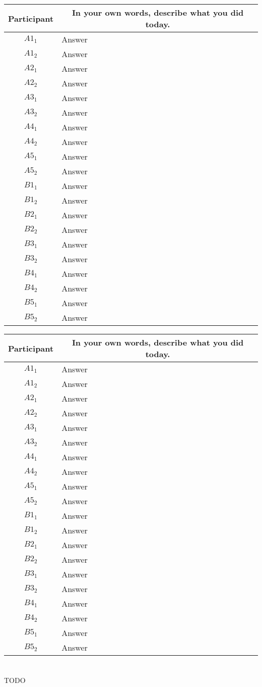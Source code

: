 \noindent
\begin{tabularx}{\linewidth}{@{}cX@{}}
  \toprule
  Participant & \multicolumn{1}{c}{
    \textbf{In your own words, describe what you did today.}
  } \\ \midrule
  $A1_{1}$ & Answer \\
  $A1_{2}$ & Answer \\
  $A2_{1}$ & Answer \\
  $A2_{2}$ & Answer \\
  $A3_{1}$ & Answer \\
  $A3_{2}$ & Answer \\
  $A4_{1}$ & Answer \\
  $A4_{2}$ & Answer \\
  $A5_{1}$ & Answer \\
  $A5_{2}$ & Answer \\
  \midrule
  $B1_{1}$ & Answer \\
  $B1_{2}$ & Answer \\
  $B2_{1}$ & Answer \\
  $B2_{2}$ & Answer \\
  $B3_{1}$ & Answer \\
  $B3_{2}$ & Answer \\
  $B4_{1}$ & Answer \\
  $B4_{2}$ & Answer \\
  $B5_{1}$ & Answer \\
  $B5_{2}$ & Answer \\
  \bottomrule
\end{tabularx}{\parfillskip=0pt\par}
\noindent
\begin{tabularx}{\linewidth}{@{}cX@{}}
  \toprule
  Participant & \multicolumn{1}{c}{
    \textbf{In your own words, describe what you did today.}
  } \\ \midrule
  $A1_{1}$ & Answer \\
  $A1_{2}$ & Answer \\
  $A2_{1}$ & Answer \\
  $A2_{2}$ & Answer \\
  $A3_{1}$ & Answer \\
  $A3_{2}$ & Answer \\
  $A4_{1}$ & Answer \\
  $A4_{2}$ & Answer \\
  $A5_{1}$ & Answer \\
  $A5_{2}$ & Answer \\
  \midrule
  $B1_{1}$ & Answer \\
  $B1_{2}$ & Answer \\
  $B2_{1}$ & Answer \\
  $B2_{2}$ & Answer \\
  $B3_{1}$ & Answer \\
  $B3_{2}$ & Answer \\
  $B4_{1}$ & Answer \\
  $B4_{2}$ & Answer \\
  $B5_{1}$ & Answer \\
  $B5_{2}$ & Answer \\
  \bottomrule
\end{tabularx}{\parfillskip=0pt\par}







\chapter{\Chick{}}

TODO
